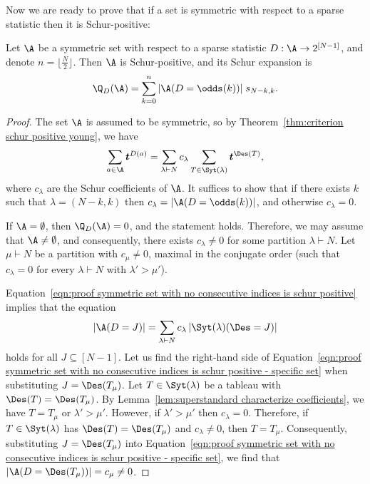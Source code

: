 Now we are ready to prove that if a set is symmetric with respect to a sparse statistic then it is Schur-positive:
\begin{lemma}
\label{lem:if two rows and symmetric then schur positive}
    Let $\A$ be a symmetric set with respect to a sparse statistic $D:\A \to 2^{[N-1]}$, and denote $n = \lfloor\frac{N}{2} \rfloor$. Then $\A$ is Schur-positive, and its Schur expansion is
    \[
        \Q_{D} (\A) = \sum_{k=0}^n |\A(D = \odds(k))|\; s_{N-k,k}.
    \]
\end{lemma}
\begin{proof}
    The set $\A$ is assumed to be symmetric, so by Theorem~\ref{thm:criterion schur positive young}, we have
    \begin{equation}\label{eqn:proof symmetric set with no consecutive indices is schur positive}
        \sum_{a \in \A} \boldsymbol{t}^{D(a)} = \sum_{\lambda \vdash N} c_\lambda \sum_{T \in \Syt(\lambda)} \boldsymbol{t}^{\Des(T)},
    \end{equation}
    where $c_\lambda$ are the Schur coefficients of $\A$. It suffices to show that if there exists $k$ such that $\lambda=(N-k,k)$ then $c_\lambda = |\A(D = \odds(k))|$, and otherwise $c_\lambda=0$.

    If $\A = \emptyset$, then $\Q_{D}(\A) = 0$, and the statement holds. Therefore, we may assume that $\A \ne \emptyset$, and consequently, there exists $c_\lambda \ne 0$ for some partition $\lambda \vdash N$. Let $\mu \vdash N$ be a partition with $c_\mu \ne 0$, maximal in the conjugate order (\ie such that $c_\lambda = 0$ for every $\lambda \vdash N$ with $\lambda' > \mu'$).
    
    Equation~\eqref{eqn:proof symmetric set with no consecutive indices is schur positive} implies that the equation
    \begin{equation}\label{eqn:proof symmetric set with no consecutive indices is schur positive - specific set}
        |\A(D = J)| = \sum_{\lambda \vdash N} c_\lambda \left|\Syt(\lambda)(\Des = J)\right|
    \end{equation}
    holds for all $J \subseteq [N-1]$. Let us find the right-hand side of Equation~\eqref{eqn:proof symmetric set with no consecutive indices is schur positive - specific set} when substituting $J = \Des(T_\mu)$. Let $T \in \Syt(\lambda)$ be a tableau with $\Des(T) = \Des(T_\mu)$. By Lemma~\ref{lem:superstandard characterize coefficients}, we have $T = T_\mu$ or $\lambda' > \mu'$. However, if $\lambda' > \mu'$ then $c_\lambda = 0$. Therefore, if $T \in \Syt(\lambda)$ has $\Des(T) = \Des(T_\mu)$ and $c_\lambda \ne 0$, then $T = T_\mu$. Consequently, substituting $J = \Des(T_\mu)$ into Equation~\eqref{eqn:proof symmetric set with no consecutive indices is schur positive - specific set}, we find that $|\A(D = \Des(T_\mu))| = c_\mu \neq 0$.


\end{proof}
